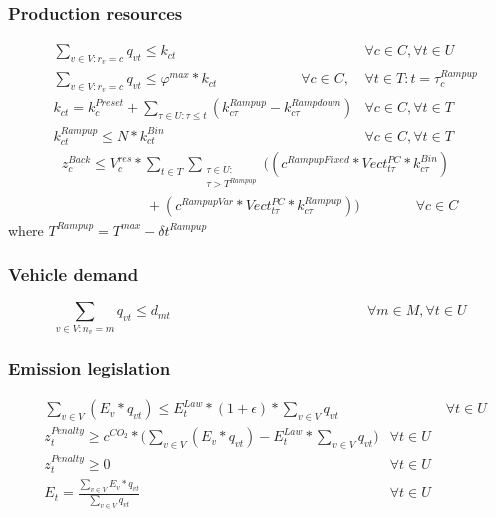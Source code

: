 \subsubsection*{Production resources}
\begin{align}
&\sum_{v \in V: r_v = c}{q_{vt}\leq k_{ct}} & \forall c \in C, \forall t \in U\label{eq:A.12}\\[0.5em]
&\sum_{v \in V: r_v = c}{q_{vt}\leq \varphi^{max}*k_{ct}}  \qquad \qquad\qquad \forall c \in C,& \forall t \in T: t = \tau_c^{Rampup}\label{eq:A.13}\\[0.5em]
&k_{ct} = k_c^{Preset}+\sum_{\tau \in U: \tau \leq t}{(k_{c\tau}^{Rampup}-k_{c\tau}^{Rampdown})} & \forall c \in C, \forall t \in T\label{eq:A.14}\\[0.5em]
&k_{ct}^{Rampup} \leq N*k_{ct}^{Bin} & \forall c \in C, \forall t \in T \label{eq:A.15}
\end{align}
\begin{multline}
 z_c^{Back} \leq V_c^{res} * \sum_{t \in T}\sum_{\substack{\tau \in U:\\ \tau > T^{Rampup}}} \bigl((c^{RampupFixed}*Vect_{t\tau}^{PC}*k_{c\tau}^{Bin})\\
 \qquad \qquad \qquad +(c^{RampupVar}*Vect_{t\tau}^{PC}*k_{c\tau}^{Rampup})\bigr) \qquad \qquad \forall c\in C\label{eq:A.16}
\end{multline}
where
$T^{Rampup} = T^{max}-\delta t^{Rampup}$ 

\subsubsection*{Vehicle demand}
\begin{equation}
    \sum_{v \in V: n_v = m}{q_{vt} \leq d_{mt}}  \qquad\qquad\qquad\qquad\qquad\qquad \qquad \forall m \in M, \forall t\in U
    \label{eq:A.17}
\end{equation}
\subsubsection*{Emission legislation}
\begin{align}
&\sum_{v \in V}{(E_v*q_{vt})}\leq E_t^{Law}*(1+\epsilon)*\sum_{v \in V}{q_{vt}} &\qquad\qquad  \forall t \in U \label{eq:A.18}\\[0.5em]
&z_t^{Penalty} \geq c^{CO_2} * \bigl(\sum_{v \in V}{(E_v * q_{vt})-E_t^{Law}*\sum_{v \in V}{q_{vt}}\bigr)} &\forall t \in U\label{eq:A.19}\\[0.5em]
&z_t^{Penalty} \geq 0 &\forall t \in U\label{eq:A.20}\\[0.5em]
&E_t = \frac{\sum_{v\in V}{E_v*q_{vt}}}{\sum_{v \in V}q_{vt}} & \forall t \in U\label{eq:A.21}
\end{align}
